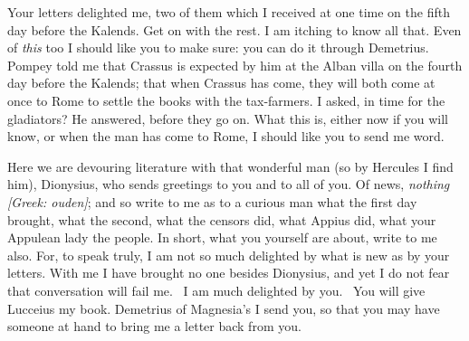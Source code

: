 

 Your letters delighted me, two of them which I received at one time on the fifth day before the Kalends. Get on with the rest. I am itching to know all that. Even of \textit{this} too I should like you to make sure: you can do it through Demetrius. Pompey told me that Crassus is expected by him at the Alban villa on the fourth day before the Kalends; that when Crassus has come, they will both come at once to Rome to settle the books with the tax-farmers. I asked, in time for the gladiators? He answered, before they go on. What this is, either now if you will know, or when the man has come to Rome, I should like you to send me word.

 Here we are devouring literature with that wonderful man (so by Hercules I find him), Dionysius, who sends greetings to you and to all of you. Of news, \textit{nothing} \textit{[Greek: ouden]}; and so write to me as to a curious man what the first day brought, what the second, what the censors did, what Appius did, what your Appulean lady the people. In short, what you yourself are about, write to me also. For, to speak truly, I am not so much delighted by what is new as by your letters. With me I have brought no one besides Dionysius, and yet I do not fear that conversation will fail me. \dag\ I am much delighted by you. \dag\ You will give Lucceius my book. Demetrius of Magnesia's I send you, so that you may have someone at hand to bring me a letter back from you.
